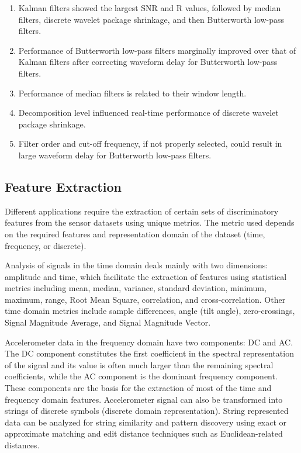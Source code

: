 \documentclass[11pt, oneside]{report}   	%
\begin{document}
\begin{enumerate}
  \item Kalman filters showed the largest SNR and R values, followed by median filters, discrete wavelet package shrinkage, and then Butterworth low-pass filters.
  \item Performance of Butterworth low-pass filters marginally improved over that of Kalman filters after correcting waveform delay for Butterworth low-pass filters.
  \item Performance of median filters is related to their window length.
  \item Decomposition level influenced real-time performance of discrete wavelet package shrinkage.
  \item Filter order and cut-off frequency, if not properly selected, could result in large waveform delay for Butterworth low-pass filters.
\end{enumerate}

\subsection{Feature Extraction}

Different applications require the extraction of certain sets of discriminatory features from the sensor datasets using unique metrics\cite{Khusainov2013}. The metric used depends on the required features and representation domain of the dataset (time, frequency, or discrete)\cite{Khusainov2013}. 

Analysis of signals in the time domain deals mainly with two dimensions: amplitude and time, which facilitate the extraction of features using statistical metrics including mean, median, variance, standard deviation, minimum, maximum, range, Root Mean Square, correlation, and cross-correlation\cite{Figo2010}. Other time domain metrics include sample differences, angle (tilt angle), zero-crossings, Signal Magnitude Average, and Signal Magnitude Vector\cite{Figo2010}.

Accelerometer data in the frequency domain have two components: DC and AC. The DC component constitutes the first coefficient in the spectral representation of the signal and its value is often much larger than the remaining spectral coefficients, while the AC component is the dominant frequency component\cite{Figo2010}. These components are the basis for the extraction of most of the time and frequency domain features. Accelerometer signal can also be transformed into strings of discrete symbols (discrete domain representation)\cite{Figo2010}. String represented data can be analyzed for string similarity and pattern discovery using exact or approximate matching and edit distance techniques such as Euclidean-related distances\cite{Figo2010}.
\end{document}

